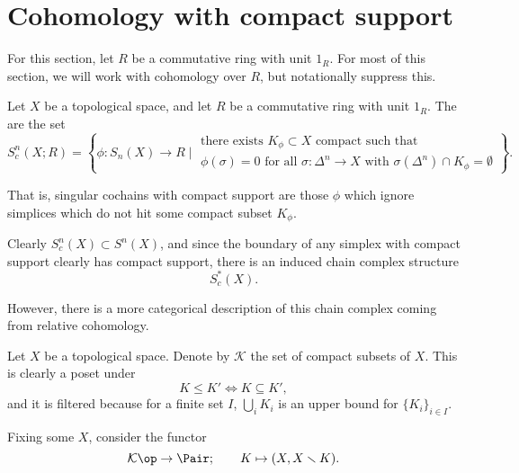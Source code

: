 \documentclass[main.tex]{subfiles}
\begin{document}
\section{Cohomology with compact support}
\label{sec:cohomology_with_compact_support}

For this section, let \(R\) be a commutative ring with unit \(1_{R}\). For most of this section, we will work with cohomology over \(R\), but notationally suppress this.

\begin{definition}
  \label{def:singular_cochains_with_compact_support}
  Let \(X\) be a topological space, and let \(R\) be a commutative ring with unit \(1_{R}\). The  are the set
  \begin{equation*}
    S^{n}_{c}(X ; R) = \left\{ \phi\colon S_{n}(X) \to R \mid \substack{\text{there exists } K_{\phi} \subset X \text{ compact such that } \\ \phi(\sigma) = 0 \text{ for all }\sigma\colon \Delta^{n} \to X \text{ with }\sigma(\Delta^{n}) \cap K_{\phi} = \emptyset } \right\}.
  \end{equation*}
\end{definition}
That is, singular cochains with compact support are those \(\phi\) which ignore simplices which do not hit some compact subset \(K_{\phi}\).

Clearly \(S^{n}_{c}(X) \subset S^{n}(X)\), and since the boundary of any simplex with compact support clearly has compact support, there is an induced chain complex structure
\begin{equation*}
  S^{*}_{c}(X).
\end{equation*}

However, there is a more categorical description of this chain complex coming from relative cohomology.

Let \(X\) be a topological space. Denote by \(\mathcal{K}\) the set of compact subsets of \(X\). This is clearly a poset under
\begin{equation*}
  K \leq K' \iff K \subseteq K',
\end{equation*}
and it is filtered because for a finite set \(I\), \(\bigcup_{i} K_{i}\) is an upper bound for \(\{K_{i}\}_{i \in I}\).

Fixing some \(X\), consider the functor
\begin{equation*}
  \mathcal{K}\op \to \Pair;\qquad K \mapsto (X, X \smallsetminus K).
\end{equation*}
\end{document}
